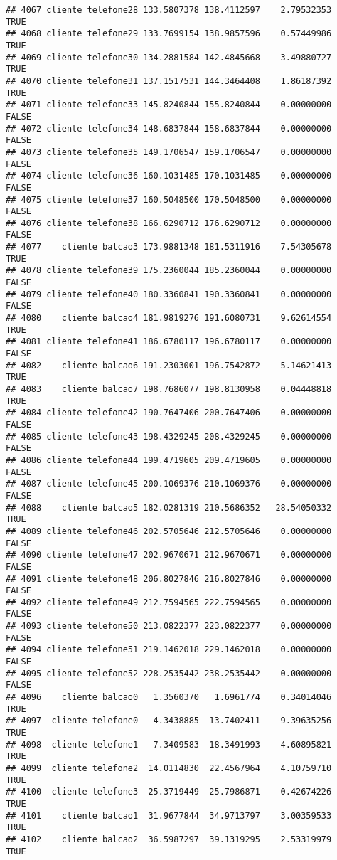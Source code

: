 \documentclass[
]{article}
\begin{document}
\begin{verbatim}
## 4067 cliente telefone28 133.5807378 138.4112597    2.79532353     TRUE
## 4068 cliente telefone29 133.7699154 138.9857596    0.57449986     TRUE
## 4069 cliente telefone30 134.2881584 142.4845668    3.49880727     TRUE
## 4070 cliente telefone31 137.1517531 144.3464408    1.86187392     TRUE
## 4071 cliente telefone33 145.8240844 155.8240844    0.00000000    FALSE
## 4072 cliente telefone34 148.6837844 158.6837844    0.00000000    FALSE
## 4073 cliente telefone35 149.1706547 159.1706547    0.00000000    FALSE
## 4074 cliente telefone36 160.1031485 170.1031485    0.00000000    FALSE
## 4075 cliente telefone37 160.5048500 170.5048500    0.00000000    FALSE
## 4076 cliente telefone38 166.6290712 176.6290712    0.00000000    FALSE
## 4077    cliente balcao3 173.9881348 181.5311916    7.54305678     TRUE
## 4078 cliente telefone39 175.2360044 185.2360044    0.00000000    FALSE
## 4079 cliente telefone40 180.3360841 190.3360841    0.00000000    FALSE
## 4080    cliente balcao4 181.9819276 191.6080731    9.62614554     TRUE
## 4081 cliente telefone41 186.6780117 196.6780117    0.00000000    FALSE
## 4082    cliente balcao6 191.2303001 196.7542872    5.14621413     TRUE
## 4083    cliente balcao7 198.7686077 198.8130958    0.04448818     TRUE
## 4084 cliente telefone42 190.7647406 200.7647406    0.00000000    FALSE
## 4085 cliente telefone43 198.4329245 208.4329245    0.00000000    FALSE
## 4086 cliente telefone44 199.4719605 209.4719605    0.00000000    FALSE
## 4087 cliente telefone45 200.1069376 210.1069376    0.00000000    FALSE
## 4088    cliente balcao5 182.0281319 210.5686352   28.54050332     TRUE
## 4089 cliente telefone46 202.5705646 212.5705646    0.00000000    FALSE
## 4090 cliente telefone47 202.9670671 212.9670671    0.00000000    FALSE
## 4091 cliente telefone48 206.8027846 216.8027846    0.00000000    FALSE
## 4092 cliente telefone49 212.7594565 222.7594565    0.00000000    FALSE
## 4093 cliente telefone50 213.0822377 223.0822377    0.00000000    FALSE
## 4094 cliente telefone51 219.1462018 229.1462018    0.00000000    FALSE
## 4095 cliente telefone52 228.2535442 238.2535442    0.00000000    FALSE
## 4096    cliente balcao0   1.3560370   1.6961774    0.34014046     TRUE
## 4097  cliente telefone0   4.3438885  13.7402411    9.39635256     TRUE
## 4098  cliente telefone1   7.3409583  18.3491993    4.60895821     TRUE
## 4099  cliente telefone2  14.0114830  22.4567964    4.10759710     TRUE
## 4100  cliente telefone3  25.3719449  25.7986871    0.42674226     TRUE
## 4101    cliente balcao1  31.9677844  34.9713797    3.00359533     TRUE
## 4102    cliente balcao2  36.5987297  39.1319295    2.53319979     TRUE

\end{verbatim}
\end{document}
